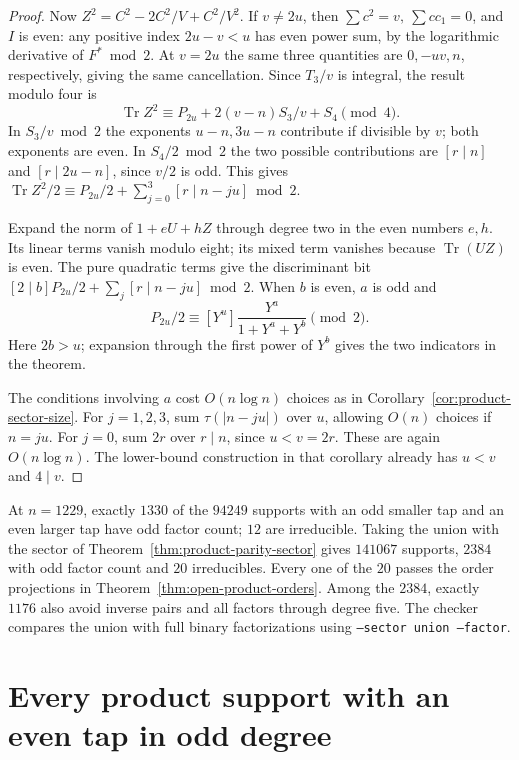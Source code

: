 \documentclass[11pt]{article}
\begin{document}
\begin{proof}
Now \(Z^2=C^2-2C^2/V+C^2/V^2\). If \(v\ne2u\), then
\(\sum c^2=v,\ \sum cc_1=0\), and \(I\) is even: any positive
index \(2u-v<u\) has even power sum, by the logarithmic derivative
of \(F^*\bmod2\). At \(v=2u\) the same three quantities are
\(0,-uv,n\), respectively, giving the same cancellation.
Since \(T_3/v\) is integral, the result modulo four is
\[
 \operatorname{Tr} Z^2\equiv P_{2u}+2(v-n)S_3/v+S_4\pmod4 .
\]
In \(S_3/v\bmod2\) the exponents \(u-n,3u-n\) contribute if
divisible by \(v\); both exponents are even. In \(S_4/2\bmod2\)
the two possible contributions are \([r\mid n]\) and
\([r\mid 2u-n]\), since \(v/2\) is odd. This gives
\(\operatorname{Tr}Z^2/2\equiv P_{2u}/2+\sum_{j=0}^3[r\mid n-ju]\bmod2\).

Expand the norm of \(1+eU+hZ\) through degree two in the even
numbers \(e,h\). Its linear terms vanish modulo eight; its mixed
term vanishes because \(\operatorname{Tr}(UZ)\) is even.
The pure quadratic terms give the discriminant bit
\([2\mid b]P_{2u}/2+\sum_j[r\mid n-ju]\bmod2\).
When \(b\) is even, \(a\) is odd and
\[
 P_{2u}/2\equiv [Y^u]\frac{Y^a}{1+Y^a+Y^b}\pmod2 .
\]
Here \(2b>u\); expansion through the first power of \(Y^b\) gives
the two indicators in the theorem.

The conditions involving \(a\) cost \(O(n\log n)\) choices as in
Corollary~\ref{cor:product-sector-size}. For \(j=1,2,3\), sum
\(\tau(|n-ju|)\) over \(u\), allowing \(O(n)\) choices if \(n=ju\).
For \(j=0\), sum \(2r\) over \(r\mid n\), since \(u<v=2r\).
These are again \(O(n\log n)\). The lower-bound construction in
that corollary already has \(u<v\) and \(4\mid v\).
\end{proof}

At \(n=1229\), exactly \(1330\) of the \(94249\) supports with an
odd smaller tap and an even larger tap have odd factor count; \(12\)
are irreducible. Taking the union with the sector of
Theorem~\ref{thm:product-parity-sector} gives \(141067\) supports,
\(2384\) with odd factor count and \(20\) irreducibles. Every one
of the \(20\) passes the order projections in Theorem~\ref{thm:open-product-orders}.
Among the \(2384\), exactly \(1176\) also avoid inverse pairs and
all factors through degree five. The checker compares the union with
full binary factorizations using \texttt{--sector union --factor}.

\section{Every product support with an even tap in odd degree}\label{sec:all-even-taps}
\end{document}
